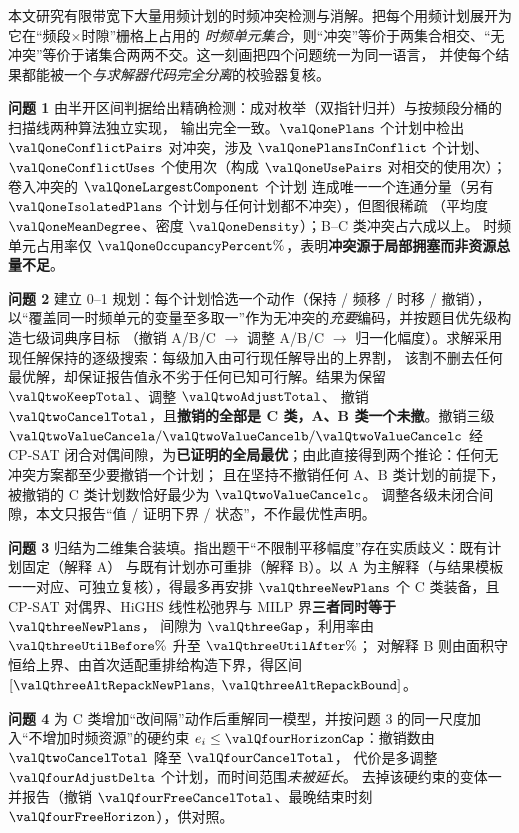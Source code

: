 本文研究有限带宽下大量用频计划的时频冲突检测与消解。把每个用频计划展开为它在“频段$\times$时隙”栅格上占用的%
\emph{时频单元集合}，则“冲突”等价于两集合相交、“无冲突”等价于诸集合两两不交。这一刻画把四个问题统一为同一语言，
并使每个结果都能被一个\emph{与求解器代码完全分离}的校验器复核。

\textbf{问题 1} 由半开区间判据给出精确检测：成对枚举（双指针归并）与按频段分桶的扫描线两种算法独立实现，
输出完全一致。$\valQonePlans$ 个计划中检出 $\valQoneConflictPairs$ 对冲突，涉及 $\valQonePlansInConflict$ 个计划、
$\valQoneConflictUses$ 个使用次（构成 $\valQoneUsePairs$ 对相交的使用次）；卷入冲突的 $\valQoneLargestComponent$ 个计划
连成唯一一个连通分量（另有 $\valQoneIsolatedPlans$ 个计划与任何计划都不冲突），但图很稀疏
（平均度 $\valQoneMeanDegree$、密度 $\valQoneDensity$）；B--C 类冲突占六成以上。
时频单元占用率仅 $\valQoneOccupancyPercent\%$，表明\textbf{冲突源于局部拥塞而非资源总量不足}。

\textbf{问题 2} 建立 0--1 规划：每个计划恰选一个动作（保持 / 频移 / 时移 / 撤销），
以“覆盖同一时频单元的变量至多取一”作为无冲突的\emph{充要}编码，并按题目优先级构造七级词典序目标
（撤销 A/B/C $\to$ 调整 A/B/C $\to$ 归一化幅度）。求解采用现任解保持的逐级搜索：每级加入由可行现任解导出的上界割，
该割不删去任何最优解，却保证报告值永不劣于任何已知可行解。结果为保留 $\valQtwoKeepTotal$、调整 $\valQtwoAdjustTotal$、
撤销 $\valQtwoCancelTotal$，且\textbf{撤销的全部是 C 类，A、B 类一个未撤}。撤销三级 $\valQtwoValueCancela/\valQtwoValueCancelb/\valQtwoValueCancelc$
经 CP-SAT 闭合对偶间隙，为\textbf{已证明的全局最优}；由此直接得到两个推论：任何无冲突方案都至少要撤销一个计划；
且在坚持不撤销任何 A、B 类计划的前提下，被撤销的 C 类计划数恰好最少为 $\valQtwoValueCancelc$。
调整各级未闭合间隙，本文只报告“值 / 证明下界 / 状态”，不作最优性声明。

\textbf{问题 3} 归结为二维集合装填。指出题干“不限制平移幅度”存在实质歧义：既有计划固定（解释 A）
与既有计划亦可重排（解释 B）。以 A 为主解释（与结果模板一一对应、可独立复核），得最多再安排
$\boldsymbol{\valQthreeNewPlans}$ 个 C 类装备，且 CP-SAT 对偶界、HiGHS 线性松弛界与 MILP 界\textbf{三者同时等于 $\valQthreeNewPlans$}，
间隙为 $\valQthreeGap$，利用率由 $\valQthreeUtilBefore\%$ 升至 $\valQthreeUtilAfter\%$；
对解释 B 则由面积守恒给上界、由首次适配重排给构造下界，得区间 $[\valQthreeAltRepackNewPlans,\ \valQthreeAltRepackBound]$。

\textbf{问题 4} 为 C 类增加“改间隔”动作后重解同一模型，并按问题 3 的同一尺度加入“不增加时频资源”的硬约束
$e_i\le\valQfourHorizonCap$：撤销数由 $\valQtwoCancelTotal$ 降至 $\valQfourCancelTotal$，
代价是多调整 $\valQfourAdjustDelta$ 个计划，而时间范围\emph{未被延长}。
去掉该硬约束的变体一并报告（撤销 $\valQfourFreeCancelTotal$、最晚结束时刻 $\valQfourFreeHorizon$），供对照。

